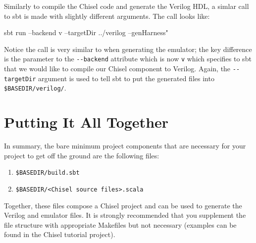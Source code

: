 \documentclass[twocolumn, 10pt]{article}
\begin{document}
Similarly to compile the Chisel code and generate the Verilog HDL, a simlar call to sbt is made with slightly different arguments. The call looks like:

\begin{bash}
sbt run --backend v --targetDir ../verilog --genHarness"
\end{bash}

Notice the call is very similar to when generating the emulator; the key difference is the parameter to the \verb+--backend+ attribute which is now \verb+v+ which specifies to sbt that we would like to compile our Chisel component to Verilog. Again, the \verb+--targetDir+ argument is used to tell sbt to put the generated files into \verb+$BASEDIR/verilog/+.

\section{Putting It All Together}

In summary, the bare minimum project components that are necessary for your project to get off the ground are the following files:

\begin{enumerate}
\item \verb+$BASEDIR/build.sbt+
\item \verb+$BASEDIR/<Chisel source files>.scala+
\end{enumerate}

Together, these files compose a Chisel project and can be used to generate the Verilog and emulator files. It is strongly recommended that you supplement the file structure with appropriate Makefiles but not necessary (examples can be found in the Chisel tutorial project).
\end{document}
